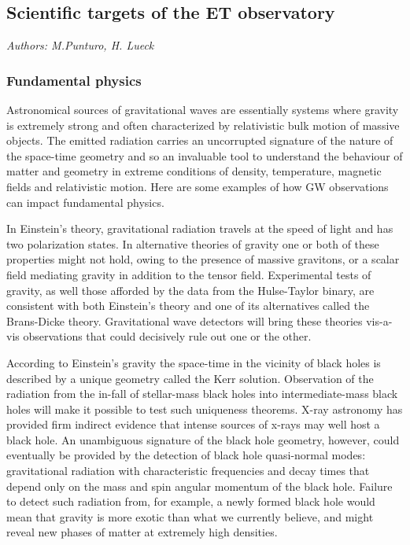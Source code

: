 \FloatBarrier
\subsection{Scientific targets of the ET observatory}
\emph{Authors: M.Punturo, H. Lueck} \\
\subsubsection{Fundamental physics}
\label{ScienceCase:FundamentalPhysics}
Astronomical sources of gravitational waves are essentially
systems where gravity is extremely strong and often
characterized by relativistic bulk motion of massive objects.
The emitted radiation carries an uncorrupted signature of the
nature of the space-time geometry and so an invaluable
tool to understand the behaviour of matter and geometry in
extreme conditions of density, temperature, magnetic fields
and relativistic motion. Here are some examples of how GW
observations can impact fundamental physics.

In Einstein's theory, gravitational radiation travels at the
speed of light and has two polarization states. In alternative
theories of gravity one or both of these properties might not
hold, owing to the presence of massive gravitons, or a scalar
field mediating gravity in addition to the tensor field. Experimental
tests of gravity, as well those afforded by the data from the
Hulse-Taylor binary, are consistent with both Einstein's theory
and one of its alternatives called the Brans-Dicke theory.
Gravitational wave detectors will bring these theories
vis-a-vis observations that could decisively rule out one
or the other.

According to Einstein's gravity the space-time in the vicinity
of black holes is described by a unique geometry called the
Kerr solution. Observation of the radiation from the in-fall
of stellar-mass black holes into intermediate-mass black holes
will make it possible to test such uniqueness theorems. X-ray
astronomy has provided firm indirect evidence that intense
sources of x-rays may well host a black hole. An unambiguous
signature of the black hole geometry, however, could eventually
be provided by the detection of black hole quasi-normal modes:
gravitational radiation with characteristic frequencies and decay
times that depend only on the mass and spin angular momentum of the black hole.
Failure to detect such radiation from, for example, a newly
formed black hole would mean that gravity is more exotic than
what we currently believe,
and might reveal new phases of matter at extremely high densities.

